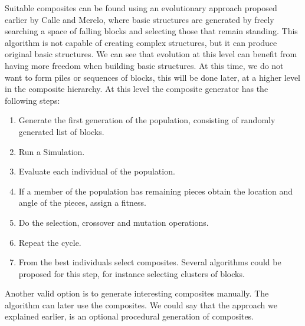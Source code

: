 \documentclass[conference]{IEEEtran}
\begin{document}
Suitable composites can be found using an evolutionary approach proposed
earlier by Calle and Merelo, where basic structures are generated by freely
searching a space of falling blocks and selecting those that remain
standing. This algorithm is not capable of creating complex structures, but
it can produce original basic structures. We can see that evolution at this
level can benefit from having more freedom when building basic structures.
At this time, we do not want to form piles or sequences of blocks, this will
be done later, at a higher level in the composite hierarchy.    
At this level the composite generator has the following steps:
\begin{enumerate}
\item Generate the first generation of the population, consisting of
randomly generated list of blocks.
\item Run a Simulation.
\item Evaluate each individual of the population.
\item If a member of the population has remaining pieces obtain the location
and angle of the pieces, assign a fitness.
\item Do the selection, crossover and mutation operations.
\item Repeat the cycle.
\item From the best individuals select composites. Several algorithms could
be proposed for this step, for instance selecting clusters of blocks.
\end{enumerate}
    
Another valid option is to generate interesting composites manually.  The
algorithm can later use the composites. We could say that the approach we
explained earlier, is an optional procedural generation of composites.
\end{document}
